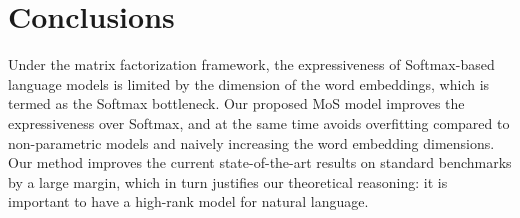 \section{Conclusions}

Under the matrix factorization framework, the expressiveness of Softmax-based language models is limited by the dimension of the word embeddings, which is termed as the Softmax bottleneck. Our proposed MoS model improves the expressiveness over Softmax, and at the same time avoids overfitting compared to non-parametric models and naively increasing the word embedding dimensions. Our method improves the current state-of-the-art results on standard benchmarks by a large margin, which in turn justifies our theoretical reasoning: it is important to have a high-rank model for natural language.

